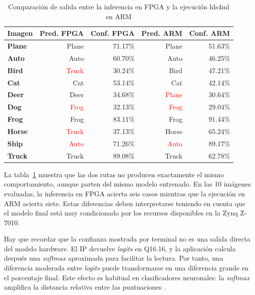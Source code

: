 \begin{table}[h!]
\centering
\begin{tabular}{|l|r|r|r|r|}
\hline
\textbf{Imagen} & \textbf{Pred. FPGA} & \textbf{Conf. FPGA} & \textbf{Pred. ARM} &
\textbf{Conf. ARM} \\ \hline
\textbf{Plane} & \textcolor{green!60!black}{Plane} & 71.17\% &
\textcolor{green!60!black}{Plane} & 51.63\% \\ \hline
\textbf{Auto}  & \textcolor{green!60!black}{Auto}  & 60.70\% &
\textcolor{green!60!black}{Auto}  & 46.25\% \\ \hline
\textbf{Bird}  & \textcolor{red}{Truck} & 30.24\% & \textcolor{green!60!black}{Bird}  &
47.21\% \\ \hline
\textbf{Cat}   & \textcolor{green!60!black}{Cat}   & 53.14\% &
\textcolor{green!60!black}{Cat}   & 42.14\% \\ \hline
\textbf{Deer}  & \textcolor{green!60!black}{Deer}  & 34.68\% & \textcolor{red}{Plane} &
30.64\% \\ \hline
\textbf{Dog}   & \textcolor{red}{Frog}  & 32.13\% & \textcolor{red}{Frog}  & 29.04\% \\ \hline
\textbf{Frog}  & \textcolor{green!60!black}{Frog}  & 83.11\% &
\textcolor{green!60!black}{Frog}  & 91.44\% \\ \hline
\textbf{Horse} & \textcolor{red}{Truck} & 37.13\% & \textcolor{green!60!black}{Horse} &
65.24\% \\ \hline
\textbf{Ship}  & \textcolor{red}{Auto}  & 71.26\% & \textcolor{red}{Auto}  & 89.17\% \\ \hline
\textbf{Truck} & \textcolor{green!60!black}{Truck} & 89.08\% &
\textcolor{green!60!black}{Truck} & 62.78\% \\ \hline
\end{tabular}
\caption{Comparación de salida entre la inferencia en FPGA y la ejecución hls4ml en ARM}
\label{tab:comparacionFpgaArmCifar10}
\end{table}

La tabla~\ref{tab:comparacionFpgaArmCifar10} muestra que las dos rutas no producen exactamente
el mismo comportamiento, aunque parten del mismo modelo entrenado.
En las 10 imágenes evaluadas, la inferencia en \ac{FPGA} acierta seis casos mientras que la
ejecución en \ac{ARM} acierta siete.
Estas diferencias deben interpretarse teniendo en cuenta que el modelo final está muy condicionado
por los recursos disponibles en la Zynq Z-7010.

Hay que recordar que la confianza mostrada por terminal no es una salida directa del modelo
hardware. El \ac{IP} devuelve \textit{logits} en Q16.16, y la aplicación calcula después
una \textit{softmax} aproximada
para facilitar la lectura. Por tanto, una diferencia moderada entre \textit{logits} puede
transformarse en
una diferencia grande en el porcentaje final. Este efecto es habitual en clasificadores neuronales:
la \textit{softmax} amplifica la distancia relativa entre las puntuaciones \citep{pmlr-v70-guo17a}.

